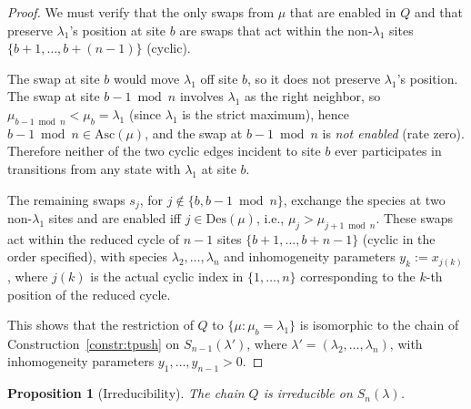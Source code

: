 \documentclass[12pt]{article}
\newtheorem{proposition}[theorem]{Proposition}
\theoremstyle{definition}
\begin{document}
\begin{proof}
We must verify that the only swaps from $\mu$ that are enabled in $Q$
and that preserve $\lambda_1$'s position at site $b$ are swaps that act
within the non-$\lambda_1$ sites $\{b+1,\dots,b+(n-1)\}$ (cyclic).

The swap at site $b$ would move $\lambda_1$ off site $b$, so it does not
preserve $\lambda_1$'s position. The swap at site $b-1\bmod n$ involves
$\lambda_1$ as the right neighbor, so $\mu_{b-1\bmod n}<\mu_b=\lambda_1$
(since $\lambda_1$ is the strict maximum), hence $b-1\bmod n\in
\mathrm{Asc}(\mu)$, and the swap at $b-1\bmod n$ is \emph{not enabled}
(rate zero). Therefore neither of the two cyclic edges incident to site
$b$ ever participates in transitions from any state with $\lambda_1$
at site $b$.

The remaining swaps $s_j$, for $j\notin\{b,b-1\bmod n\}$, exchange the
species at two non-$\lambda_1$ sites and are enabled iff $j\in
\mathrm{Des}(\mu)$, i.e., $\mu_j>\mu_{j+1\bmod n}$. These swaps act
within the reduced cycle of $n-1$ sites $\{b+1,\dots,b+n-1\}$ (cyclic
in the order specified), with species $\lambda_2,\dots,\lambda_n$ and
inhomogeneity parameters $y_k:=x_{j(k)}$, where $j(k)$ is the actual
cyclic index in $\{1,\dots,n\}$ corresponding to the $k$-th position of
the reduced cycle.

This shows that the restriction of $Q$ to $\{\mu:\mu_b=\lambda_1\}$ is
isomorphic to the chain of Construction~\ref{constr:tpush} on
$S_{n-1}(\lambda')$, where $\lambda'=(\lambda_2,\dots,\lambda_n)$, with
inhomogeneity parameters $y_1,\dots,y_{n-1}>0$.
\end{proof}

\begin{proposition}[Irreducibility]\label{prop:irred}
The chain $Q$ is irreducible on $S_n(\lambda)$.
\end{proposition}
\end{document}
